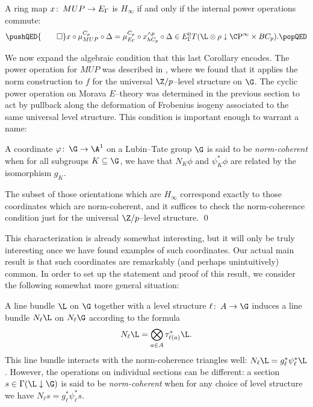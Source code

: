 \begin{corollary}
A ring map \(x\colon\thinspace MUP \to E_\Gamma\) is \(H_\infty\) if and only if the internal power operations commute: \[
\pushQED{\qed}
x \circ \mu^{C_p}_{MUP} \circ \Delta = \mu^{C_p}_{E_\Gamma} \circ x^{\sm p}_{hC_p} \circ \Delta \in E_\Gamma^0 T(\L \otimes \rho \downarrow \CP^\infty \times BC_p).
\qedhere
\popQED
\]
\end{corollary}

We now expand the algebraic condition that this last Corollary encodes.  The power operation for \(MUP\) was described in , where we found that it applies the norm construction to \(f\) for the universal \(\Z/p\)--level structure on \(\G\).  The cyclic power operation on Morava \(E\)--theory was determined in the previous section to act by pullback along the deformation of Frobenius isogeny associated to the same universal level structure.  This condition is important enough to warrant a name:

\begin{definition}\label{NormCoherentDefn}
A coordinate \(\phi\co \G \to \A^1\) on a Lubin--Tate group \(\G\) is said to be \textit{norm-coherent} when for all subgroups \(K \subseteq \G\), we have that \(N_K \phi\) and \(\psi_K^* \phi\) are related by the isomorphism \(g_K\).
\end{definition}

\begin{corollary}
The subset of those orientations which are \(H_\infty\) correspond exactly to those coordinates which are norm-coherent, and it suffices to check the norm-coherence condition just for the universal \(\Z/p\)--level structure. \qed
\end{corollary}

This characterization is already somewhat interesting, but it will only be truly interesting once we have found examples of such coordinates.  Our actual main result is that such coordinates are remarkably (and perhaps unintuitively) common.  In order to set up the statement and proof of this result, we consider the following somewhat more general situation:

\begin{definition}
A line bundle \(\L\) on \(\G\) together with a level structure \(\ell\co A \to \G\) induces a line bundle \(N_\ell \L\) on \(N_\ell \G\) according to the formula \[N_\ell \L = \bigotimes_{a \in A} \tau_{\ell(a)}^* \L.\]  This line bundle interacts with the norm-coherence triangles well: \(N_\ell \L = g_\ell^* \psi_\ell^* \L\).  However, the operations on individual sections can be different: a section \(s \in \Gamma(\L \downarrow \G)\) is said to be \textit{norm-coherent} when for any choice of level structure we have \(N_\ell s = g_\ell^* \psi_\ell^* s\).
\end{definition}

